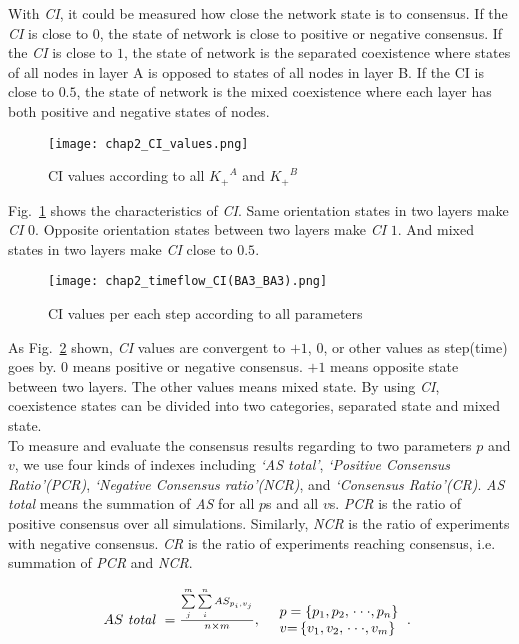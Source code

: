 With \textit{CI}, it could be measured how close the network state is to consensus. If the \textit{CI} is close to $0$, the state of network is close to positive or negative consensus. If the \textit{CI} is close to $1$, the state of network is the separated coexistence where states of all nodes in layer A is opposed to states of all nodes in layer B. If the CI is close to $0.5$, the state of network is the mixed coexistence where each layer has both positive and negative states of nodes.

\begin{figure}[!htb]
	\centering
	\texttt{[image: chap2\_CI\_values.png]}
	\caption{CI values according to all ${K_ + }^A$ and ${K_ + }^B$  }
	\label{chap2_CI_values}
\end{figure}
Fig.~\ref{chap2_CI_values} shows the characteristics of \textit{CI}. Same orientation states in two layers make \textit{CI} $0$. Opposite orientation states between two layers make \textit{CI} $1$. And mixed states in two layers make \textit{CI} close to $0.5$. \\

\begin{figure}[!htb]
	\centering
	\texttt{[image: chap2\_timeflow\_CI(BA3\_BA3).png]}
	\caption{CI values per each step according to all parameters}
	\label{chap2_timeflow_CI(BA3_BA3)}
\end{figure}
As Fig.~\ref{chap2_timeflow_CI(BA3_BA3)} shown, \textit{CI} values are convergent to $+1$, $0$, or other values as step(time) goes by. $0$ means positive or negative consensus. $+1$ means opposite state between two layers. The other values means mixed state. By using \textit{CI}, coexistence states can be divided into two categories, separated state and mixed state.\\   

To measure and evaluate the consensus results regarding to two parameters $p$ and $v$, we use four kinds of indexes including \textit{`AS total'}, \textit{`Positive Consensus Ratio'(PCR)}, \textit{`Negative Consensus ratio'(NCR)}, and \textit{`Consensus Ratio'(CR)}. \textit{AS total} means the summation of \textit{AS} for all $p$s and all $v$s. \textit{PCR} is the ratio of positive consensus over all simulations. Similarly, \textit{NCR} is the ratio of experiments with negative consensus. \textit{CR} is the ratio of experiments reaching consensus, i.e. summation of \textit{PCR} and \textit{NCR}.

\begin{equation}
\begin{array}{cl}
AS\mbox{ \textit{total} } = \frac{{\sum\limits_j^m {\sum\limits_i^n {A{S_{{p _i},{v _j}}}} } }}{{n \times m }}, &
\begin{array}{l}
p  = \left\{ {{p _{\rm{1}}},{p _{\rm{2}}},\left. {\cdot\cdot\cdot,{p _n}} \right\}} \right.\\
v {\rm{ = }}\left\{ {{v _{\rm{1}}},{v _{\rm{2}}},\left. {\cdot\cdot\cdot,{v _m}} \right\}} \right.
\end{array}.\
\end{array}
\label{AS_total}
\end{equation}

